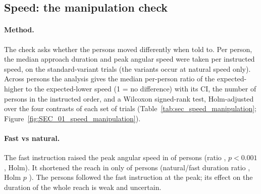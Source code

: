 \subsection{Speed: the manipulation check}\label{app:sec:manipulation}

\paragraph{Method.} The check asks whether the persons moved differently when told to. Per person, the median
approach duration and peak angular speed were taken per instructed speed, on the 
standard-variant trials (the variants occur at natural speed only). Across persons the analysis gives the median
per-person ratio of the expected-higher to the expected-lower speed (1 = no difference) with its CI, the number of
persons in the instructed order, and a Wilcoxon signed-rank test, Holm-adjusted over the four contrasts of each
set of trials (Table~\ref{tab:sec_speed_manipulation}; Figure~\ref{fig:SEC_01_speed_manipulation}).

\paragraph{Fast vs natural.} The fast instruction raised the peak angular speed in
 of  persons (ratio
, $p < 0.001$, Holm). It shortened the reach in only
 of  persons
(natural/fast duration ratio , Holm $p$
). The persons followed the fast instruction at the peak; its effect
on the duration of the whole reach is weak and uncertain.

